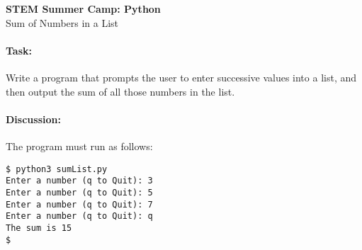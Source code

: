 \documentclass[11pt]{article}
\begin{document}
    \begin{center}

        \large\textbf{STEM Summer Camp: Python} \\
        Sum of Numbers in a List \\

    \end{center}

    \paragraph{Task:} Write a program that prompts the user to enter
    successive values into a list, and then output the sum of all those
    numbers in the list.  
    
    \paragraph{Discussion:} The program must run as follows:
    
    \vspace{1.5em}

\begin{verbatim}
$ python3 sumList.py
Enter a number (q to Quit): 3
Enter a number (q to Quit): 5
Enter a number (q to Quit): 7
Enter a number (q to Quit): q
The sum is 15
$
\end{verbatim}
    
\end{document}
